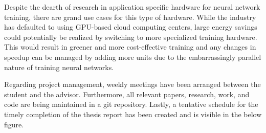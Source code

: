 \documentclass[a4paper]{article}
\begin{document}
\par 
Despite the dearth of research in application specific hardware for neural network training, there are grand use cases for this type of hardware. While the industry has defaulted to using GPU-based cloud computing centers, large energy savings could potentially be realized by switching to more specialized training hardware. This would result in greener and more cost-effective training and any changes in speedup can be managed by adding more units due to the embarrassingly parallel nature of training neural networks.
\par 
Regarding project management, weekly meetings have been arranged between the student and the advisor. Furthermore, all relevant papers, research, work, and code are being maintained in a git repository. Lastly, a tentative schedule for the timely completion of the thesis report has been created and is visible in the below figure.
\end{document}
